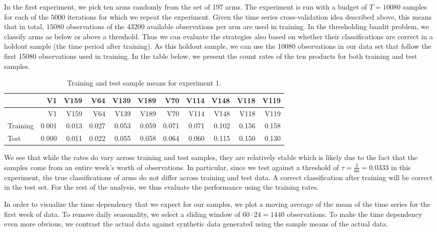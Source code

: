 \documentclass[11pt,]{article}
\begin{document}
In the first experiment, we pick ten arms randomly from the set of 197
arms. The experiment is run with a budget of \(T=10080\) samples for
each of the \(5000\) iterations for which we repeat the experiment.
Given the time series cross-validation idea described above, this means
that in total, \(15080\) observations of the \(43200\) available
observations per arm are used in training. In the thresholding bandit
problem, we classify arms as below or above a threshold. Thus we can
evaluate the strategies also based on whether their classifications are
correct in a holdout sample (the time period after training). As this
holdout sample, we can use the 10080 observations in our data set that
follow the first 15080 observations used in training. In the table
below, we present the count rates of the ten products for both training
and test samples.

\begin{longtable}[]{@{}lrrrrrrrrrr@{}}
\caption{Training and test sample means for experiment
1.}\tabularnewline
\toprule
& V1 & V159 & V64 & V139 & V189 & V70 & V114 & V148 & V118 &
V119\tabularnewline
\midrule
\endfirsthead
\toprule
& V1 & V159 & V64 & V139 & V189 & V70 & V114 & V148 & V118 &
V119\tabularnewline
\midrule
\endhead
Training & 0.001 & 0.013 & 0.027 & 0.053 & 0.059 & 0.071 & 0.071 & 0.102
& 0.156 & 0.158\tabularnewline
Test & 0.000 & 0.011 & 0.022 & 0.055 & 0.058 & 0.064 & 0.060 & 0.115 &
0.150 & 0.130\tabularnewline
\bottomrule
\end{longtable}

We see that while the rates do vary across training and test samples,
they are relatively stable which is likely due to the fact that the
samples come from an entire week's worth of observations. In particular,
since we test against a threshold of \(\tau = \frac{2}{60} = 0.0333\) in
this experiment, the true classifications of arms do not differ across
training and test data. A correct classification after training will be
correct in the test set. For the rest of the analysis, we thus evaluate
the performance using the training rates.

In order to visualize the time dependency that we expect for our
samples, we plot a moving average of the mean of the time series for the
first week of data. To remove daily seasonality, we select a sliding
window of \(60\cdot24 = 1440\) observations. To make the time dependency
even more obvious, we contrast the actual data against synthetic data
generated using the sample means of the actual data.
\end{document}
